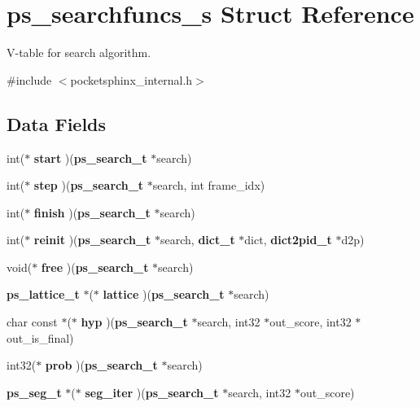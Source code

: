 \section{ps\+\_\+searchfuncs\+\_\+s Struct Reference}
\label{structps__searchfuncs__s}


V-\/table for search algorithm.  




{\ttfamily \#include $<$pocketsphinx\+\_\+internal.\+h$>$}

\subsection*{Data Fields}
\begin{DoxyCompactItemize}
\item 
int($\ast$ {\bfseries start} )({\bf ps\+\_\+search\+\_\+t} $\ast$search)\label{structps__searchfuncs__s_aeba78bc55e0053208a406e5755e328c3}

\item 
int($\ast$ {\bfseries step} )({\bf ps\+\_\+search\+\_\+t} $\ast$search, int frame\+\_\+idx)\label{structps__searchfuncs__s_a5e339a33aaa9abce12aad960ccd8ec69}

\item 
int($\ast$ {\bfseries finish} )({\bf ps\+\_\+search\+\_\+t} $\ast$search)\label{structps__searchfuncs__s_af1b419057d3112ed400b3e8244350298}

\item 
int($\ast$ {\bfseries reinit} )({\bf ps\+\_\+search\+\_\+t} $\ast$search, {\bf dict\+\_\+t} $\ast$dict, {\bf dict2pid\+\_\+t} $\ast$d2p)\label{structps__searchfuncs__s_a6ac3701ff0654da72bd55e89e4936884}

\item 
void($\ast$ {\bfseries free} )({\bf ps\+\_\+search\+\_\+t} $\ast$search)\label{structps__searchfuncs__s_a30c9ebb9036ed7286aba45f3f25abd7e}

\item 
{\bf ps\+\_\+lattice\+\_\+t} $\ast$($\ast$ {\bfseries lattice} )({\bf ps\+\_\+search\+\_\+t} $\ast$search)\label{structps__searchfuncs__s_a94ff0b5cb1ae6660bba5ed3e9886e127}

\item 
char const $\ast$($\ast$ {\bfseries hyp} )({\bf ps\+\_\+search\+\_\+t} $\ast$search, int32 $\ast$out\+\_\+score, int32 $\ast$out\+\_\+is\+\_\+final)\label{structps__searchfuncs__s_a74899805519c49115dd55477312bd3a9}

\item 
int32($\ast$ {\bfseries prob} )({\bf ps\+\_\+search\+\_\+t} $\ast$search)\label{structps__searchfuncs__s_aa601dc1539edfb40284e94798ba2ab40}

\item 
{\bf ps\+\_\+seg\+\_\+t} $\ast$($\ast$ {\bfseries seg\+\_\+iter} )({\bf ps\+\_\+search\+\_\+t} $\ast$search, int32 $\ast$out\+\_\+score)\label{structps__searchfuncs__s_a7bb9a58892eb6b25f97fac70b05b1f12}

\end{DoxyCompactItemize}


